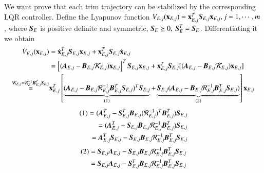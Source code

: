 We want prove that each trim trajectory can be stabilized by the corresponding LQR controller.
Define the Lyapunov function $V_{E,j}(\vec{x}_{E,j})
=\vec{x}_{E,j}^{T}\emph{\textbf{S}}_{E,j}\vec{x}_{E,j}, j=1, \cdots, m$, where $\emph{\textbf{S}}_{E}$ is positive definite and symmetric, $\emph{\textbf{S}}_{E}\succeq 0,~\emph{\textbf{S}}_{E}^{T}=\emph{\textbf{S}}_{E}$.  Differentiating it we obtain 
\begin{align}
\dot{V}_{E,j}(\vec{x}_{E,j})&=
\dot{\vec{x}}_{E,j}^{T}\emph{\textbf{S}}_{E,j}\vec{x}_{E,j}+
\vec{x}_{E,j}^{T}\emph{\textbf{S}}_{E,j}\dot{\vec{x}}_{E,j} \nonumber \\
&= \left[(\emph{\textbf{A}}_{E,j}-
\emph{\textbf{B}}_{E,j}\mathcal{K}_{E,j})\vec{x}_{E,j}\right]^{T}
\emph{\textbf{S}}_{E,j}\vec{x}_{E,j}+\vec{x}_{E,j}^{T}\emph{\textbf{S}}_{E,j}
[(\emph{\textbf{A}}_{E,j}-\emph{\textbf{B}}_{E,j}\mathcal{K}_{E,j})\vec{x}_{E,j}]
\nonumber \\
\overset{\mathcal{K}_{E,j}
=\mathcal{R}_{E}^{-1}\emph{\textbf{B}}_{E,j}^{T}\emph{\textbf{S}}_{E,j}}{=}
&\vec{x}_{E,j}^{T}\left[\underbrace{(\emph{\textbf{A}}_{E,j}-
\emph{\textbf{B}}_{E,j}\mathcal{R}_{E,j}^{-1}\emph{\textbf{B}}_{E,j}^{T}
\emph{\textbf{S}}_{E,j})^{T}\emph{\textbf{S}}_{E,j}}_{(1)}
+
\underbrace{\emph{\textbf{S}}_{E,j}
(\emph{\textbf{A}}_{E,j}-\emph{\textbf{B}}_{E,j}
\mathcal{R}_{E,j}^{-1}\emph{\textbf{B}}_{E,j}^{T}\emph{\textbf{S}}_{E,j})}_{(2)}
\right]
\vec{x}_{E,j}
\end{align}
\begin{align}
(1)=(\emph{\textbf{A}}_{E,j}^{T}-\emph{\textbf{S}}_{E,j}^{T}
\emph{\textbf{B}}_{E,j}(\mathcal{R}_{E,j}^{-1})^{T}
\emph{\textbf{B}}_{E,j}^{T})\emph{\textbf{S}}_{E,j} \nonumber \\
=(\emph{\textbf{A}}_{E,j}^{T}
-\emph{\textbf{S}}_{E,j}\emph{\textbf{B}}_{E,j}\mathcal{R}^{-1}_{E,j}
\emph{\textbf{B}}^{T}_{E,j})\emph{\textbf{S}}_{E,j} \nonumber \\
=\emph{\textbf{A}}_{E,j}^{T}\emph{\textbf{S}}_{E,j}
-\emph{\textbf{S}}_{E,j}\emph{\textbf{B}}_{E,j}\mathcal{R}^{-1}_{E,j}
\emph{\textbf{B}}^{T}_{E,j}\emph{\textbf{S}}_{E,j}
\end{align}
\begin{align}
(2)=\emph{\textbf{S}}_{E,j}\emph{\textbf{A}}_{E,j}-\emph{\textbf{S}}_{E,j}
\emph{\textbf{B}}_{E,j}\mathcal{R}^{-1}_{E,j}
\emph{\textbf{B}}^{T}_{E,j}\emph{\textbf{S}}_{E,j} \nonumber \\
=\emph{\textbf{S}}_{E,j}\emph{\textbf{A}}_{E,j}-\emph{\textbf{S}}_{E,j}^{T}
\emph{\textbf{B}}_{E,j}\mathcal{R}^{-1}_{E,j}
\emph{\textbf{B}}^{T}_{E,j}\emph{\textbf{S}}_{E,j}
\end{align}
